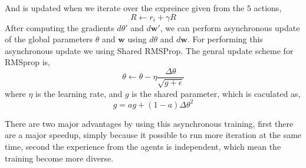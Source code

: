 \documentclass[11pt]{article}
\begin{document}
And is updated when we iterate over the expreince given from the $5$ actions,
\begin{equation}
    R \leftarrow r_{i} + \gamma R
\end{equation}
After computing the gradients $d\theta'$ and $d\mathbf{w}'$, we can perform asynchronous update of the global parameters $\theta$ and $\mathbf{w}$ using $d\theta$ and $d\mathbf{w}$. For performing this asynchronous update we using Shared RMSProp. The genral update scheme for RMSprop is,
\begin{equation}
    \theta \leftarrow \theta - \eta \frac{\Delta \theta}{\sqrt{g + \epsilon}}
\end{equation}
where $\eta$ is the learning rate, and $g$ is the shared parameter, which is caculated as,
\begin{equation}
    g = a g + (1 - a)\Delta \theta^{2}
\end{equation}

There are two major advantages by using this asynchronous training,
first there are a major speedup, 
simply because it possible to run more iteration at the same time,
second the experience from 
the agents is independent, which mean the training become more diverse. 
\end{document}
